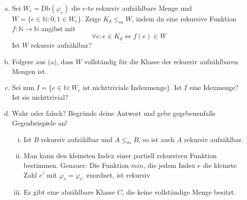\documentclass[german,headsepline]{scrartcl}
\theoremstyle{definition}
\begin{document}
	\begin{question}[subtitle={Blatt 13, 2015}]
		\begin{enumerate}[(a)]
			\item Sei $W_e=\text{Db}(\varphi_e)$ die $e$-te rekursiv aufzählbare Menge
				und $W=\{e\in\mathbb{N}\colon0,1\in W_e\}$.
				Zeige $K_d\leq_mW$, indem du eine rekursive Funktion $f:\mathbb{N}\to\mathbb{N}$ angibst mit
				\[\forall e\colon e\in K_d\Leftrightarrow f(e)\in W\]
				Ist $W$ rekursiv aufzählbar?
			\item Folgere aus (a), dass $W$ vollständig für die Klasse der rekursiv aufzählbaren Mengen ist.
			\item Sei nun $I=\{e\in\mathbb{N}\colon W_e\text{ ist nichttriviale Indexmenge}\}$.
				Ist $I$ eine Idexmenge? Ist sie nichttrivial?
			\item Wahr oder falsch?
				Begründe deine Antwort und gebe gegebenenfalls Gegenbeispiele an!
				\begin{enumerate}[(i)]
					\item Ist $B$ rekursiv aufzählbar und $A\leq_m B$, so ist auch $A$ rekursiv aufzählbar.
					\item Man kann den kleinsten Index einer partiell rekursiven Funktion bestimmen.
						Genauer: Die Funktion $min$,
						die jedem Index $e$ die kleinste Zahl $e'$ mit $\varphi_e=\varphi_{e'}$ zuordnet, ist rekursiv
					\item Es gibt eine abzählbare Klasse $C$, die keine vollständige Menge besitzt.
				\end{enumerate}
		\end{enumerate}
	\end{question}
\end{document}
